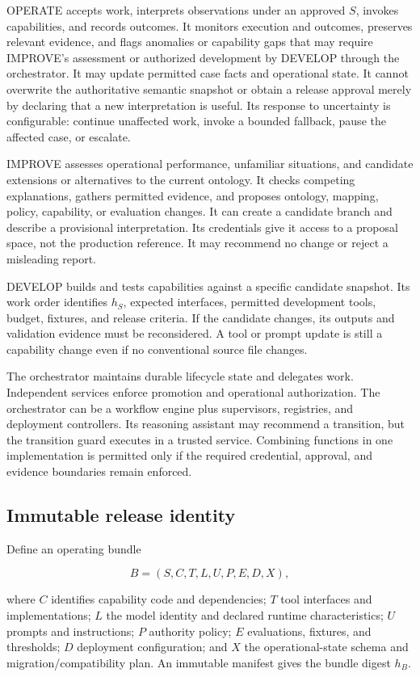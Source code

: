 \documentclass[preprint,12pt,authoryear]{elsarticle}
\begin{document}
OPERATE accepts work, interprets observations under an approved \(S\),
invokes capabilities, and records outcomes. It monitors execution and
outcomes, preserves relevant evidence, and flags anomalies or capability
gaps that may require IMPROVE's assessment or authorized development by
DEVELOP through the orchestrator. It may update permitted case facts and
operational state. It cannot overwrite the authoritative semantic
snapshot or obtain a release approval merely by declaring that a new
interpretation is useful. Its response to uncertainty is configurable:
continue unaffected work, invoke a bounded fallback, pause the affected
case, or escalate.

IMPROVE assesses operational performance, unfamiliar situations, and
candidate extensions or alternatives to the current ontology. It checks
competing explanations, gathers permitted evidence, and proposes
ontology, mapping, policy, capability, or evaluation changes. It can
create a candidate branch and describe a provisional interpretation. Its
credentials give it access to a proposal space, not the production
reference. It may recommend no change or reject a misleading report.

DEVELOP builds and tests capabilities against a specific candidate
snapshot. Its work order identifies \(h_S\), expected interfaces,
permitted development tools, budget, fixtures, and release criteria. If
the candidate changes, its outputs and validation evidence must be
reconsidered. A tool or prompt update is still a capability change even
if no conventional source file changes.

The orchestrator maintains durable lifecycle state and delegates work.
Independent services enforce promotion and operational authorization.
The orchestrator can be a workflow engine plus supervisors, registries,
and deployment controllers. Its reasoning assistant may recommend a
transition, but the transition guard executes in a trusted service.
Combining functions in one implementation is permitted only if the
required credential, approval, and evidence boundaries remain enforced.

\subsection{Immutable release
identity}\label{immutable-release-identity}

Define an operating bundle

\[B=(S,C,T,L,U,P,E,D,X),\]

where \(C\) identifies capability code and dependencies; \(T\) tool
interfaces and implementations; \(L\) the model identity and declared
runtime characteristics; \(U\) prompts and instructions; \(P\) authority
policy; \(E\) evaluations, fixtures, and thresholds; \(D\) deployment
configuration; and \(X\) the operational-state schema and
migration/compatibility plan. An immutable manifest gives the bundle
digest \(h_B\).
\end{document}
